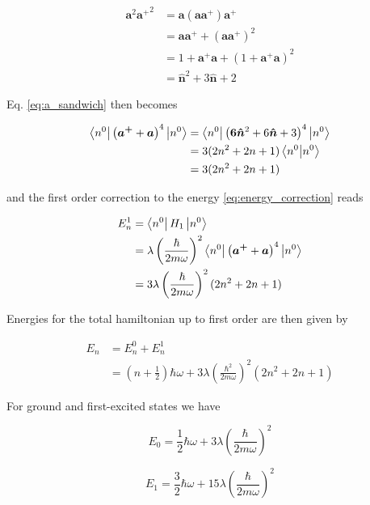 \documentclass{article}
\begin{document}
\begin{align}
\bm{a}^2 {\bm{a^+}}^2 & = \bm{a} (\bm{a} \bm{a^+}) \bm{a^+} \nonumber \\
& = \bm{a} \bm{a^+} + (\bm{a} \bm{a^+})^2 \nonumber \\
& = 1 + \bm{a^+} \bm{a} + (1 + \bm{a^+} \bm{a})^2 \nonumber \\
& = \bm{ \hat{n} }^2 + 3 \bm{ \hat{n} } + 2
\end{align}

Eq. \eqref{eq:a_sandwich} then becomes


\begin{align}
\bra{n^0} \left( \bm{a^+} + \bm{a} \right)^4 \ket{n^0} & = \bra{n^0} \left( \bm{ 6 \hat{n} }^2 + 6 \bm{ \hat{n} } + 3 \right)^4 \ket{n^0} \nonumber \\
& = 3 (2n^2 + 2n +1) \braket{n^0}{n^0} \nonumber \\
& = 3(2n^2 + 2n +1)
\end{align}

and the first order correction to the energy \eqref{eq:energy_correction} reads

\begin{align}
E_n^1 & = \bra{n^0} H_1 \ket{n^0} \nonumber \\
& = \lambda \left( \frac{\hbar}{2m \omega} \right)^2 \bra{n^0} \left( \bm{a^+} + \bm{a} \right)^4 \ket{n^0} \nonumber \\
& = 3 \lambda \left( \frac{\hbar}{2m \omega} \right)^2 (2n^2 + 2n +1)
\end{align}

Energies for the total hamiltonian up to first order are then given by

\begin{align}
E_n & = E_n^0 + E_n^1 \nonumber \\
& = \left( n + \frac{1}{2} \right) \hbar \omega + 3 \lambda \left( \frac{\hbar^2}{2m\omega} \right)^2 (2n^2 + 2n +1)
\end{align}

For ground and first-excited states we have

\begin{equation}
E_0 = \frac{1}{2} \hbar \omega + 3 \lambda \left( \frac{\hbar}{2m\omega} \right)^2
\end{equation}

\begin{equation}
E_1 = \frac{3}{2} \hbar \omega + 15 \lambda \left( \frac{\hbar}{2m\omega} \right)^2
\end{equation}
\end{document}
